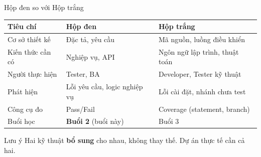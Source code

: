 \documentclass[aspectratio=169,12pt]{beamer}
\begin{document}
\begin{frame}[shrink=8]{Hộp đen so với Hộp trắng}
  \vspace{-0.2em}
  \begin{center}
  \scriptsize
  \renewcommand{\arraystretch}{0.9}
  \begin{tabular}{p{2.5cm}p{3.8cm}p{3.8cm}}
    \toprule
    \textbf{Tiêu chí} & \textbf{Hộp đen} & \textbf{Hộp trắng} \\
    \midrule
    Cơ sở thiết kế & Đặc tả, yêu cầu & Mã nguồn, luồng điều khiển \\
    Kiến thức cần có & Nghiệp vụ, API & Ngôn ngữ lập trình, thuật toán \\
    Người thực hiện & Tester, BA & Developer, Tester kỹ thuật \\
    Phát hiện & Lỗi yêu cầu, logic nghiệp vụ & Lỗi cài đặt, nhánh chưa test \\
    Công cụ đo & Pass/Fail & Coverage (statement, branch) \\
    Buổi học & \textbf{Buổi 2} (buổi này) & Buổi 3 \\
    \bottomrule
  \end{tabular}
  \renewcommand{\arraystretch}{1}
  \end{center}

  \vspace{0.05em}
  \begin{alertblock}{Lưu ý}
    Hai kỹ thuật \textbf{bổ sung} cho nhau, không thay thế. Dự án thực tế cần cả hai.
  \end{alertblock}
\end{frame}
\end{document}
